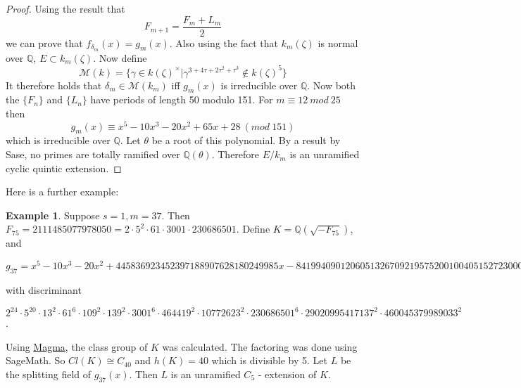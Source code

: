 \documentclass[12pt]{extarticle}
\newcommand{\Q}{\mathbb{Q}}
\newcommand{\<}{\langle}
\renewcommand{\>}{\rangle}
\theoremstyle{definition}
\newtheorem*{example}{Example}
\begin{document}
\begin{proof}
Using the result that \begin{equation}
    F_{m+1}= \frac{F_m + L_m}{2}
\end{equation}
we can prove that $f_{\delta_m}(x) = g_m(x)$. Also using the fact that $k_m(\zeta)$ is normal over $\Q$, $E\subset k_m(\zeta)$. Now define  \begin{equation}
    \mathcal{M}(k)=\{\gamma \in k(\zeta)^{\times}|\gamma^{3+4\tau+2\tau^{2}+\tau^3}\notin k(\zeta)^5\}
\end{equation}
It therefore holds that $\delta_m \in \mathcal{M}(k_m)$ iff $g_m(x)$ is irreducible over $\Q$. Now both the $\{F_n\}$ and $\{L_n\}$ have periods of length 50 modulo 151. For $m\equiv12 \: mod \: 25$ then \begin{equation}
    g_m(x) \equiv x^5 - 10x^3 - 20x^2 + 65x + 28\:(mod \:151)
\end{equation} which is irreducible over $\Q$. Let $\theta$ be a root of this polynomial. By a result by Sase, no primes are totally ramified over $\Q(\theta)$. Therefore $E/k_m$ is an unramified cyclic quintic extension. 
\end{proof}
Here is a further example:
\begin{example}
Suppose $s=1, m= 37$. Then $F_{75} = 2111485077978050 = 2 \cdot 5^2 \cdot 61 \cdot 3001 \cdot 230686501$. Define $K = \Q(\sqrt{-F_{75}})$, and 

\begin{center}
$g_{37} = x^5 - 10x^3 - 20x^2 + 445836923452397188907628180249985x  - 841994090120605132670921957520010040515272300004
$
\end{center}
with discriminant 

\begin{center}
$2^{24} \cdot 5^{20} \cdot 13^2 \cdot 61^6 \cdot 109^2 \cdot 139^2 \cdot 3001^6 \cdot 464419^2 \cdot 10772623^2 \cdot 230686501^6 \cdot 29020995417137^2 \cdot 460045379989033^2$. 
\end{center}

Using \href{http://magma.maths.usyd.edu.au/calc/}{Magma}, the class group of $K$ was calculated. The factoring was done using SageMath. So $Cl(K) \cong C_{40} $ and $h(K) = 40$ which is divisible by 5. Let $L$ be the splitting field of $g_{37}(x)$. Then $L$ is an unramified $C_5$ - extension of $K$. 
\end{example}
\end{document}
